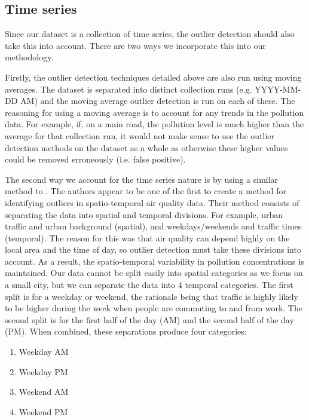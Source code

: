 \documentclass[11pt]{report}
\begin{document}
\subsection{Time series}

Since our dataset is a collection of time series, the outlier detection should also take this into account. There are two ways we incorporate this into our methodology.

Firstly, the outlier detection techniques detailed above are also run using moving averages. The dataset is separated into distinct collection runs (e.g. YYYY-MM-DD AM) and the moving average outlier detection is run on each of these. The reasoning for using a moving average is to account for any trends in the pollution data. For example, if, on a main road, the pollution level is much higher than the average for that collection run, it would not make sense to use the outlier detection methods on the dataset as a whole as otherwise these higher values could be removed erroneously (i.e. false positive).

The second way we account for the time series nature is by using a similar method to \cite{vanZoest2018outlierdetection}. The authors appear to be one of the first to create a method for identifying outliers in spatio-temporal air quality data. Their method consists of separating the data into spatial and temporal divisions. For example, urban traffic and urban background (spatial), and weekdays/weekends and traffic times (temporal). The reason for this was that air quality can depend highly on the local area and the time of day, so outlier detection must take these divisions into account. As a result, the spatio-temporal variability in pollution concentrations is maintained. Our data cannot be split easily into spatial categories as we focus on a small city, but we can separate the data into 4 temporal categories. The first split is for a weekday or weekend, the rationale being that traffic is highly likely to be higher during the week when people are commuting to and from work. The second split is for the first half of the day (AM) and the second half of the day (PM). When combined, these separations produce four categories:
\begin{enumerate}
\item Weekday AM
\item Weekday PM
\item Weekend AM
\item Weekend PM
\end{enumerate}
\end{document}
